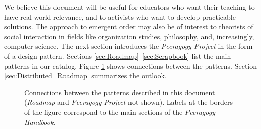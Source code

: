 We believe this document will be useful for educators who want their teaching to have real-world relevance, and to activists who want to develop practicable solutions.   The approach to emergent order may also be of interest to theorists of social interaction in fields like organization studies, philosophy, and, increasingly, computer science.  The next section introduces the \emph{Peeragogy Project} in the form of a design pattern.  Sections \ref{sec:Roadmap}--\ref{sec:Scrapbook} list the main patterns in our catalog.  Figure \ref{fig:connections} shows connections between the patterns.  Section \ref{sec:Distributed_Roadmap} summarizes the outlook.

\begin{figure}
{\centering


\par
}
\vspace{-.9in}
\caption{Connections between the patterns described in this document (\emph{Roadmap} and \emph{Peeragogy Project} not shown).  Labels at the borders of the figure correspond to the main sections of the \emph{Peeragogy Handbook}.\label{fig:connections}}
\end{figure}
